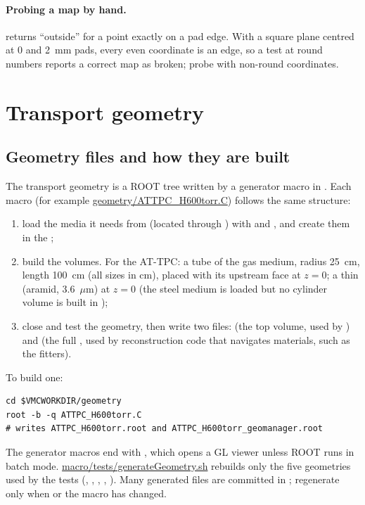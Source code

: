 \paragraph{Probing a map by hand.}  returns ``outside'' for a point exactly on a
pad edge. With a square plane centred at 0 and 2~mm pads, every even coordinate is an edge, so a test
at round numbers reports a correct map as broken; probe with non-round coordinates.

\section{Transport geometry}
\label{sec:geometry}

\subsection{Geometry files and how they are built}

The transport geometry is a ROOT  tree written by a generator macro in .
Each macro (for example \url{geometry/ATTPC_H600torr.C}) follows the same structure:
\begin{enumerate}
  \item load the media it needs from  (located through
    ) with  and , and create them in the ;
  \item build the volumes. For the AT-TPC: a tube  of the gas medium, radius
    25~cm, length 100~cm (all sizes in cm), placed with its upstream face at $z=0$; a thin
     (aramid, 3.6~$\mu$m) at $z=0$ (the steel medium is loaded but no cylinder volume is built in );
  \item close and test the geometry, then write two files:  (the top volume, used
    by ) and  (the full
    , used by reconstruction code that navigates materials, such as the fitters).
\end{enumerate}
To build one:
\begin{verbatim}
cd $VMCWORKDIR/geometry
root -b -q ATTPC_H600torr.C
# writes ATTPC_H600torr.root and ATTPC_H600torr_geomanager.root
\end{verbatim}
The generator macros end with , which opens a GL viewer unless ROOT runs in
batch mode. \url{macro/tests/generateGeometry.sh} rebuilds only the five geometries used by the tests
(, , , ,
). Many generated files are committed in ; regenerate only when
 or the macro has changed.

